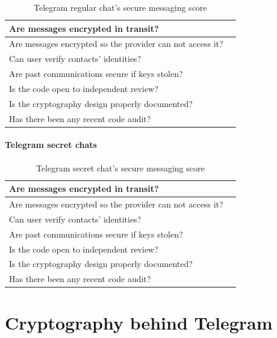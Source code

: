 \documentclass[thesis=M,english]{FITthesis}[2012/10/20]
\newcommand{\cmark}{\ding{51}}%
\newcommand{\xmark}{\ding{55}}%
\begin{document}
\begin{table}[htb]
	\centering
	\caption{Telegram regular chat's secure messaging score}
	\label{tab:telegram-regular-eff}
	\begin{tabular}{|l|l|}
		\hline
		Are messages encrypted in transit? & \cmark \\\hline
		Are messages encrypted so the provider can not access it? & \xmark \\ \hline
		Can user verify contacts' identities? & \xmark \\ \hline
		Are past communications secure if keys stolen? & \xmark \\ \hline
		Is the code open to independent review? & \xmark \\ \hline
		Is the cryptography design properly documented? & \cmark \\ \hline
		Has there been any recent code audit? & \cmark \\ \hline
	\end{tabular}
\end{table}


\subsubsection{Telegram secret chats}

\begin{table}[htb]
	\centering
	\caption{Telegram secret chat's secure messaging score}
	\label{tab:telegram-secret-eff}
	\begin{tabular}{|l|l|}
		\hline
		Are messages encrypted in transit? & \cmark \\\hline
		Are messages encrypted so the provider can not access it? & \cmark \\ \hline
		Can user verify contacts' identities? & \cmark \\ \hline
		Are past communications secure if keys stolen? & \cmark \\ \hline
		Is the code open to independent review? & \cmark \\ \hline
		Is the cryptography design properly documented? & \cmark \\ \hline
		Has there been any recent code audit? & \cmark \\ \hline
	\end{tabular}
\end{table}







\chapter{Cryptography behind Telegram}\label{telegramcrypto}
\end{document}
